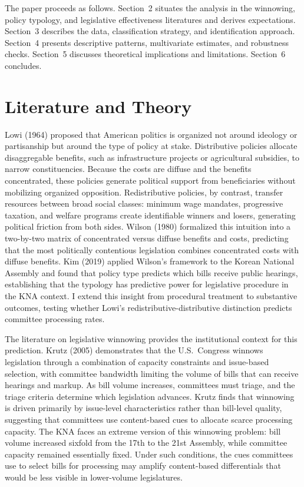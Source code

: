 \documentclass[11pt]{article}
\begin{document}
The paper proceeds as follows. Section~2 situates the analysis in the winnowing, policy typology, and legislative effectiveness literatures and derives expectations. Section~3 describes the data, classification strategy, and identification approach. Section~4 presents descriptive patterns, multivariate estimates, and robustness checks. Section~5 discusses theoretical implications and limitations. Section~6 concludes.


\section{Literature and Theory}

Lowi (1964) proposed that American politics is organized not around ideology or partisanship but around the type of policy at stake. Distributive policies allocate disaggregable benefits, such as infrastructure projects or agricultural subsidies, to narrow constituencies. Because the costs are diffuse and the benefits concentrated, these policies generate political support from beneficiaries without mobilizing organized opposition. Redistributive policies, by contrast, transfer resources between broad social classes: minimum wage mandates, progressive taxation, and welfare programs create identifiable winners and losers, generating political friction from both sides. Wilson (1980) formalized this intuition into a two-by-two matrix of concentrated versus diffuse benefits and costs, predicting that the most politically contentious legislation combines concentrated costs with diffuse benefits. Kim (2019) applied Wilson's framework to the Korean National Assembly and found that policy type predicts which bills receive public hearings, establishing that the typology has predictive power for legislative procedure in the KNA context. I extend this insight from procedural treatment to substantive outcomes, testing whether Lowi's redistributive-distributive distinction predicts committee processing rates.

The literature on legislative winnowing provides the institutional context for this prediction. Krutz (2005) demonstrates that the U.S.\ Congress winnows legislation through a combination of capacity constraints and issue-based selection, with committee bandwidth limiting the volume of bills that can receive hearings and markup. As bill volume increases, committees must triage, and the triage criteria determine which legislation advances. Krutz finds that winnowing is driven primarily by issue-level characteristics rather than bill-level quality, suggesting that committees use content-based cues to allocate scarce processing capacity. The KNA faces an extreme version of this winnowing problem: bill volume increased sixfold from the 17th to the 21st Assembly, while committee capacity remained essentially fixed. Under such conditions, the cues committees use to select bills for processing may amplify content-based differentials that would be less visible in lower-volume legislatures.
\end{document}
